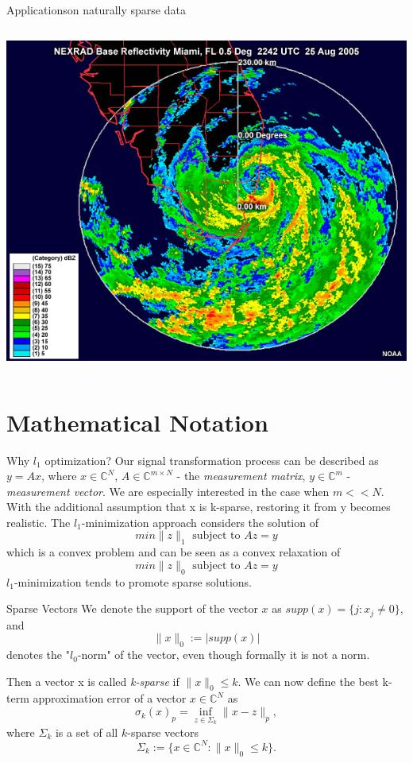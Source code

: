 \documentclass[
  english,            %
  aspectratio=169,    %
]{tumbeamer}
\begin{document}
\begin{frame}{Applications}{on naturally sparse data}
\begin{columns}
\begin{column}{.5\linewidth}
        \par \includegraphics[width=\linewidth/2]{images/katrina_radar_fla.jpg}
      \end{column}
  \end{columns}
\end{frame}

\section{Mathematical Notation}

\begin{frame}{Why $l_1$ optimization?}
Our signal transformation process can be described as $y = Ax$, where $x \in \mathbb{C}^N$, $A \in \mathbb{C}^{m \times N}$ - the \textit{measurement matrix}, $y \in \mathbb{C}^m$ - \textit{measurement vector}. We are especially interested in the case when $m << N$. With the additional assumption that x is k-sparse, restoring it from y becomes realistic. The $l_1$-minimization approach considers the solution of 
\[min \lVert z \rVert _1 \text{ subject to } Az = y\]
which is a convex problem and can be seen as a convex relaxation of
\[min \lVert z \rVert _0 \text{ subject to } Az = y\]
$l_1$-minimization tends to promote sparse solutions.
\end{frame}

\begin{frame}{Sparse Vectors}
We denote the support of the vector $x$ as $supp(x) = \{j : x_j \neq 0\}$, and 
\[ \lVert x \rVert_0 := |supp(x)| \]
denotes the "$l_0$-norm" of the vector, even though formally it is not a norm.

Then a vector x is called \textit{k-sparse} if $\lVert x \rVert_0 \leq k$. We can now define the best k-term approximation error of a vector $x \in \mathbb{C}^N$ as
\[ \sigma_k (x)_p = \inf_{z \in \Sigma_k} \lVert x - z \rVert_p, \]
where $\Sigma_k$ is a set of all $k$-sparse vectors
\[\Sigma_k := \{x \in \mathbb{C}^N : \lVert x \rVert_0 \leq k\}. \]
\end{frame}
\end{document}
